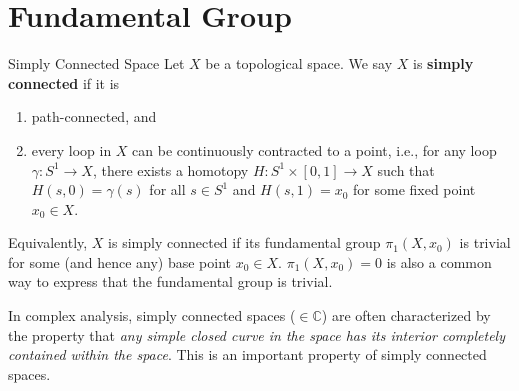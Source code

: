 \chapter{Fundamental Group} %

\begin{definition}{Simply Connected Space}\label{def:simply_connected_space} %
    Let \(X\) be a topological space.
    We say \(X\) is \textbf{simply connected} if it is 
    \begin{enumerate}
        \item path-connected, and 
        \item every loop in \(X\) can be continuously contracted to a point, i.e., 
            for any loop \(\gamma: S^1 \to X\), there exists a homotopy \(H: S^1 \times [0, 1] \to X\) such that 
            \(H(s, 0) = \gamma(s)\) for all \(s \in S^1\) and \(H(s, 1) = x_0\) for some fixed point \(x_0 \in X\).
    \end{enumerate}

    Equivalently, \(X\) is simply connected if its 
    fundamental group \(\pi_1(X, x_0)\) is trivial for some (and hence any) base point \(x_0 \in X\).
    \(\pi_1(X, x_0) = 0\) is also a common way to express that the fundamental group is trivial.
\end{definition}
In complex analysis, simply connected spaces (\(\in \mathbb{C}\)) are often characterized by the property that 
\emph{any simple closed curve in the space has its interior completely contained within the space}. 
This is an important property of simply connected spaces.